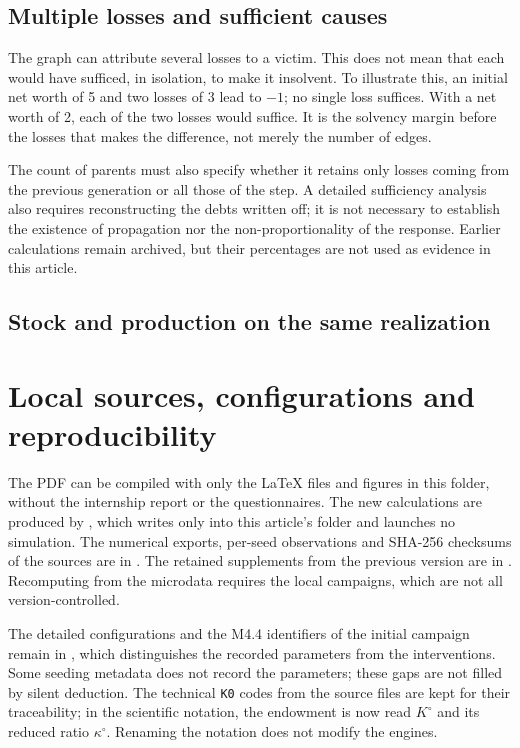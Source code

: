 \subsection{Multiple losses and sufficient causes}
The graph can attribute several losses to a victim.
This does not mean that each would have sufficed, in isolation, to
make it insolvent. To illustrate this, an initial net worth
of 5 and two losses of 3 lead to $-1$; no single loss
suffices. With a net worth of 2, each of the two losses
would suffice. It is the solvency margin before the losses that
makes the difference, not merely the number of edges.

The count of parents must also specify whether it retains only
losses coming from the previous generation or all
those of the step. A detailed sufficiency analysis also requires
reconstructing the debts written off; it is not
necessary to establish the existence of propagation nor the
non-proportionality of the response. Earlier calculations
remain archived, but their percentages are not used
as evidence in this article.

\subsection{Stock and production on the same realization}

\FloatBarrier
\section{Local sources, configurations and reproducibility}\label{sec:sources_revision}
The PDF can be compiled with only the LaTeX files and figures
in this folder, without the internship report or the questionnaires.
The new calculations are produced by
, which writes only into
this article's folder and launches no simulation.
The numerical exports, per-seed observations and
SHA-256 checksums of the sources are in .
The retained supplements from the previous version are in
. Recomputing from the microdata
requires the local campaigns, which are not all version-controlled.



The detailed configurations and the M4.4 identifiers of the
initial campaign remain in
, which distinguishes the
recorded parameters from the interventions. Some seeding metadata
does not record the parameters; these gaps are not filled
by silent deduction.
The technical \texttt{K0} codes from the source files are
kept for their traceability; in the scientific notation,
the endowment is now read $K^\circ$ and its reduced ratio
$\kappa^\circ$. Renaming the notation does not modify the engines.


